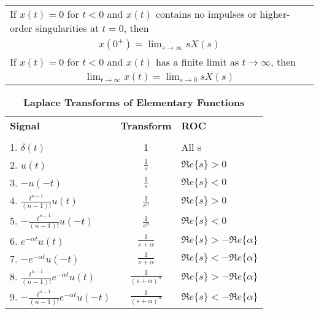 \documentclass[12pt]{article}
\numberwithin{equation}{section}
\newcommand{\R}{\mbox{$\Re e\{s\}$}}
\begin{document}
\begin{table}[htbp]
\begin{center}
\begin{tabular}{l|c|c|p{2in}}
\multicolumn{4}{l}{If $x(t)=0$ for $ t < 0$ and $x(t)$ contains no impulses or higher-order singularities at $t=0$, then}  \\
\multicolumn{4}{c}{$x(0^+) = \lim_{s\to \infty} sX(s)$}\\
\multicolumn{4}{l}{If $x(t)=0$ for $ t<0$ and $x(t)$ has a finite limit as $ t\to \infty$, then}\\
\multicolumn{4}{c}{$\lim_{t\to\infty} x(t) = \lim_{s\to 0}sX(s)$}\\
\hline
    \end{tabular}
  \end{center}
\end{table}
\clearpage

%
%

\begin{table}[htbp]
   \vspace*{-1.0in}
  \begin{center}

    \caption{\bf Laplace Transforms of Elementary
      Functions}
    \renewcommand{\arraystretch}{2.00}
    \begin{tabular}{l|c|l} \\
      {\bf Signal} &{\bf Transform} &{\bf ROC} \\ %
      &&\\
      \hline 1. $\delta(t)$ &1 & All
      s \\
      2. $u(t)$ &$\displaystyle\frac{1}{s}$ &$\R > 0$ \\
      3. $-u(-t)$ &$\displaystyle\frac{1}{s}$ &$\R < 0$ \\
      4. $\displaystyle\frac{t^{n-1}}{(n-1)!}u(t)$
      &$\displaystyle\frac{1}{s^{n}}$ &$\R > 0$ \\
      5. $-\displaystyle\frac{t^{n-1}}{(n-1)!}u(-t)$
      &$\displaystyle\frac{1}{s^{n}}$ &$\R < 0$ \\
      6. $e^{-\alpha t}u(t)$ &$\displaystyle\frac{1}{s + \alpha}$
      &$\R > -\Re e \{ \alpha\} $  \\
      7. $-e^{-\alpha t}u(-t)$ &$\displaystyle\frac{1}{s +
        \alpha}$ &$\R < -\Re e \{ \alpha\} $ \\
      8. $\displaystyle\frac{t^{n-1}}{(n-1)!}e^{-\alpha t}u(t)$
      &$\displaystyle\frac{1}{(s + \alpha)^{n}}$ &$\R > -\Re e \{ \alpha\} $ \\
      9. $\displaystyle-{\frac{t^{n-1}}{(n-1)!}e^{-\alpha t}u(-t)}$
      &$\displaystyle\frac{1}{(s + \alpha)^{n}}$ &$\R < -\Re e \{ \alpha\} $ \\


\end{tabular}
\end{center}
\end{table}
\end{document}
